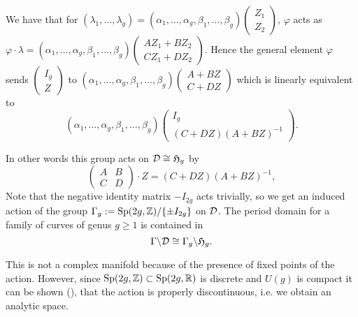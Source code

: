 \documentclass[../main.tex]{subfiles}
\begin{document}
\begin{es}
We have that for $(\lambda_1, \dots, \lambda_g)=(\alpha_1, \dots , \alpha_g ,\beta_1, \dots , \beta_g) \left(\begin{array}{c} Z_1 \\ Z_2 \end{array} \right)$, $\varphi$ acts as $\varphi \cdot \lambda = (\alpha_1, \dots , \alpha_g ,\beta_1, \dots , \beta_g) \left(\begin{array}{c} A Z_1 + B Z_2 \\ CZ_1 + D Z_2 \end{array} \right) $. Hence the general element $\varphi$ sends  $ \left(\begin{array}{c} I_g \\ Z \end{array} \right)$ to $(\alpha_1, \dots , \alpha_g ,\beta_1, \dots , \beta_g) \left(\begin{array}{c} A + B Z \\ C + D Z \end{array} \right)$ which is linearly equivalent to 
\[ (\alpha_1, \dots , \alpha_g ,\beta_1, \dots , \beta_g) \left(\begin{array}{c} I_g \\ {(C + D Z)}{(A +BZ)^{-1}}  \end{array} \right).
\]

In other words this group acts on $\mathcal{D} \cong \mathfrak{H}_g$ by
\[ \left( \begin{array}{cc} A & B \\ C & D \end{array} \right) \cdot Z = (C + DZ)(A + BZ)^{-1}, \]
Note that the negative identity matrix $-I_{2g}$ acts trivially, so we get an induced action of the group $\Gamma_g := \mathrm{Sp}(2g,\mathbb{Z}) / \{\pm I_{2g}\}$ on $\mathcal{D}$. The period domain for a family of curves of genus $g \geq 1$ is contained in
\[ \Gamma \backslash \mathcal{D} \cong \Gamma_g \backslash \mathfrak{H}_g.\]

This is not a complex manifold because of the presence of fixed points of the action. However, since $\mathrm{Sp}(2g, \mathbb{Z}) \subset \mathrm{Sp}(2g, \mathbb{R})$ is discrete and $U(g)$ is compact it can be shown (\cite[Sect. 1.2]{CMSP03}), that the action is properly discontinuous, i.e. we obtain an analytic space.
\end{es}
\end{document}
